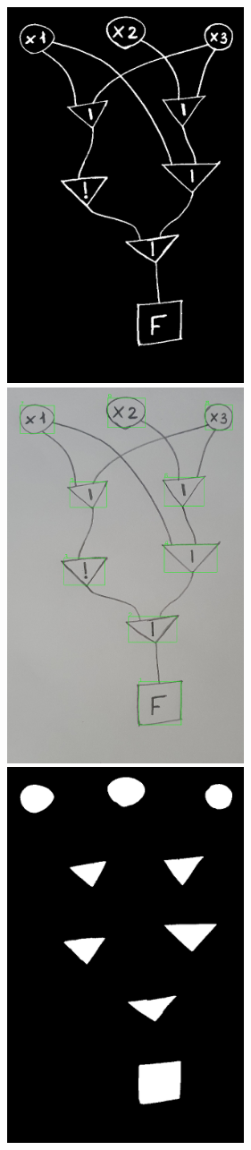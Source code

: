 \documentclass[makeidx, a4paper, 14pt]{extarticle}
\begin{document}
\begin{figure}[H]
    \centering
    \includegraphics[width=70mm]{handwritten_1_binarized_image.png}
    \includegraphics[width=70mm]{handwritten_1_detect_labels.png}
    \includegraphics[width=70mm]{handwritten_1_vertices_pixels.png}

\end{figure}
\end{document}
